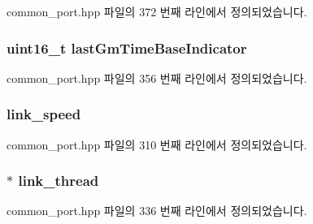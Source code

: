 common\+\_\+port.\+hpp 파일의 372 번째 라인에서 정의되었습니다.

\subsubsection[{\texorpdfstring{last\+Gm\+Time\+Base\+Indicator}{lastGmTimeBaseIndicator}}]{\setlength{\rightskip}{0pt plus 5cm}uint16\+\_\+t last\+Gm\+Time\+Base\+Indicator\hspace{0.3cm}{\ttfamily [private]}}\hypertarget{class_common_port_a789b1ba33c589f9c04d9de18418e4f4e}{}\label{class_common_port_a789b1ba33c589f9c04d9de18418e4f4e}


common\+\_\+port.\+hpp 파일의 356 번째 라인에서 정의되었습니다.

\subsubsection[{\texorpdfstring{link\+\_\+speed}{link_speed}}]{ link\+\_\+speed\hspace{0.3cm}{\ttfamily [private]}}\hypertarget{class_common_port_aae24fc4f200e75aa8215f797b2561dbf}{}\label{class_common_port_aae24fc4f200e75aa8215f797b2561dbf}


common\+\_\+port.\+hpp 파일의 310 번째 라인에서 정의되었습니다.

\subsubsection[{\texorpdfstring{link\+\_\+thread}{link_thread}}]{$\ast$ link\+\_\+thread\hspace{0.3cm}{\ttfamily [private]}}\hypertarget{class_common_port_a6c20b9b679b91a3c182699d6d001377a}{}\label{class_common_port_a6c20b9b679b91a3c182699d6d001377a}


common\+\_\+port.\+hpp 파일의 336 번째 라인에서 정의되었습니다.

